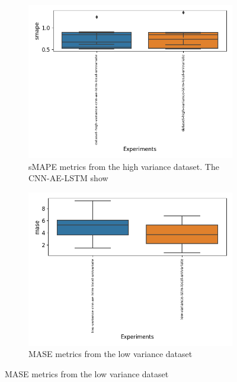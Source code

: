 \begin{figure}[h!]
\begin{subfigure}[t]{0.49\textwidth}
  \end{subfigure}
  \begin{subfigure}[t]{0.49\textwidth}
    \includegraphics[width=\textwidth]{./figs/results/boxplot/smape-dataset_high_variance.png}
    \hfill
    \caption{sMAPE metrics from the high variance dataset.
      The CNN-AE-LSTM show
    }
    \label{fig:results:boxplot-smape-dataset-high-variance}
  \end{subfigure}
  \begin{subfigure}[b]{0.49\textwidth}
    \includegraphics[width=\textwidth]{./figs/results/boxplot/mase-dataset_low_variance.png}
    \hfill
    \caption{MASE metrics from the low variance dataset}


\end{subfigure}
\end{figure}
